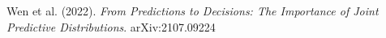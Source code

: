 \documentclass[preview]{standalone}
\begin{document}
Wen et al. (2022). \textit{From Predictions to Decisions: The Importance of Joint Predictive Distributions}. arXiv:2107.09224\\
\end{document}
